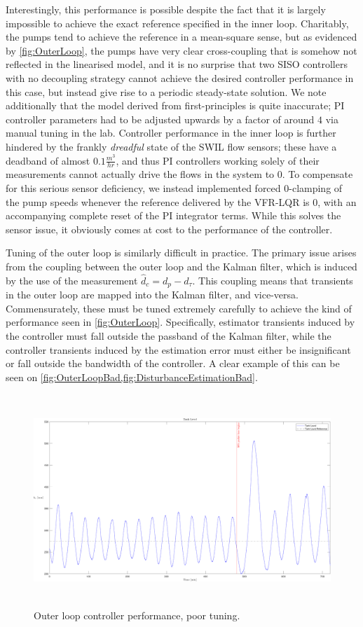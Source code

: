 Interestingly, this performance is possible despite the fact that it is largely impossible to achieve the exact reference specified in the inner loop. Charitably, the pumps tend to achieve the reference in a mean-square sense, but as evidenced by \cref{fig:OuterLoop}, the pumps have very clear cross-coupling that is somehow not reflected in the linearised model, and it is no surprise that two SISO controllers with no decoupling strategy cannot achieve the desired controller performance in this case, but instead give rise to a periodic steady-state solution. We note additionally that the model derived from first-principles is quite inaccurate; PI controller parameters had to be adjusted upwards by a factor of around $4$ via manual tuning in the lab. Controller performance in the inner loop is further hindered by the frankly \textit{dreadful} state of the SWIL flow sensors; these have a deadband of almost $0.1 \si{\frac{m^3}{hr}}$, and thus PI controllers working solely of their measurements cannot actually drive the flows in the system to $0$. To compensate for this serious sensor deficiency, we instead implemented forced $0$-clamping of the pump speeds whenever the reference delivered by the VFR-LQR is $0$, with an accompanying complete reset of the PI integrator terms. While this solves the sensor issue, it obviously comes at cost to the performance of the controller.

Tuning of the outer loop is similarly difficult in practice. The primary issue arises from the coupling between the outer loop and the Kalman filter, which is induced by the use of the measurement $\hat{d}_c = d_p - d_\tau$. This coupling means that transients in the outer loop are mapped into the Kalman filter, and vice-versa. Commensurately, these must be tuned extremely carefully to achieve the kind of performance seen in \cref{fig:OuterLoop}. Specifically, estimator transients induced by the controller must fall outside the passband of the Kalman filter, while the controller transients induced by the estimation error must either be insignificant or fall outside the bandwidth of the controller. A clear example of this can be seen on \cref{fig:OuterLoopBad,fig:DisturbanceEstimationBad}.

\clearpage

\begin{figure}[h!]
	\includegraphics[height=8cm,width=\linewidth]{Pictures/OuterLoopBad.pdf}
	\caption{Outer loop controller performance, poor tuning.}
	\label{fig:OuterLoopBad}
\end{figure}

